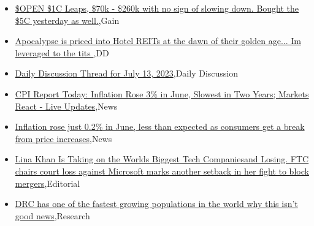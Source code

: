 \documentclass{article}%
\begin{document}
%
\begin{itemize}%
\item%
\href{https://reddit.com/r/wallstreetbets/comments/14yib8p/open\_1c\_leaps\_70k\_260k\_with\_no\_sign\_of\_slowing/}{\$OPEN \$1C Leaps, \$70k - \$260k with no sign of slowing down. Bought the \$5C yesterday as well.},Gain%
\item%
\href{https://reddit.com/r/wallstreetbets/comments/14ygnwk/apocalypse\_is\_priced\_into\_hotel\_reits\_at\_the\_dawn/}{Apocalypse is priced into Hotel REITs at the dawn of their golden age... Im leveraged to the tits },DD%
\item%
\href{https://reddit.com/r/wallstreetbets/comments/14yglfs/daily\_discussion\_thread\_for\_july\_13\_2023/}{Daily Discussion Thread for July 13, 2023},Daily Discussion%
\item%
\href{https://reddit.com/r/Economics/comments/14xnknj/cpi\_report\_today\_inflation\_rose\_3\_in\_june\_slowest/}{CPI Report Today: Inflation Rose 3\% in June, Slowest in Two Years; Markets React - Live Updates},News%
\item%
\href{https://reddit.com/r/Economics/comments/14xnclp/inflation\_rose\_just\_02\_in\_june\_less\_than\_expected/}{Inflation rose just 0.2\% in June, less than expected as consumers get a break from price increases},News%
\item%
\href{https://reddit.com/r/Economics/comments/14xn5o3/lina\_khan\_is\_taking\_on\_the\_worlds\_biggest\_tech/}{Lina Khan Is Taking on the Worlds Biggest Tech Companiesand Losing. FTC chairs court loss against Microsoft marks another setback in her fight to block mergers},Editorial%
\item%
\href{https://reddit.com/r/Economics/comments/14xkv8i/drc\_has\_one\_of\_the\_fastest\_growing\_populations\_in/}{DRC has one of the fastest growing populations in the world  why this isn't good news},Research%
\end{itemize}%
\end{document}
